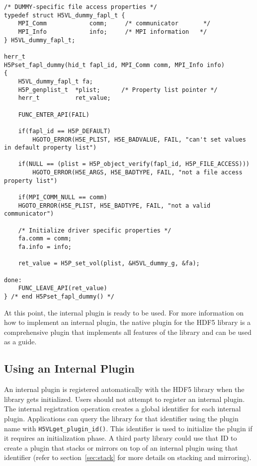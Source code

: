 \begin{lstlisting}
/* DUMMY-specific file access properties */
typedef struct H5VL_dummy_fapl_t {
    MPI_Comm            comm;     /* communicator       */
    MPI_Info            info;     /* MPI information   */
} H5VL_dummy_fapl_t;

herr_t
H5Pset_fapl_dummy(hid_t fapl_id, MPI_Comm comm, MPI_Info info)
{
    H5VL_dummy_fapl_t fa;
    H5P_genplist_t  *plist;      /* Property list pointer */
    herr_t          ret_value;

    FUNC_ENTER_API(FAIL)

    if(fapl_id == H5P_DEFAULT)
        HGOTO_ERROR(H5E_PLIST, H5E_BADVALUE, FAIL, "can't set values in default property list")

    if(NULL == (plist = H5P_object_verify(fapl_id, H5P_FILE_ACCESS)))
        HGOTO_ERROR(H5E_ARGS, H5E_BADTYPE, FAIL, "not a file access property list")

    if(MPI_COMM_NULL == comm)
	HGOTO_ERROR(H5E_PLIST, H5E_BADTYPE, FAIL, "not a valid communicator")

    /* Initialize driver specific properties */
    fa.comm = comm;
    fa.info = info;

    ret_value = H5P_set_vol(plist, &H5VL_dummy_g, &fa);

done:
    FUNC_LEAVE_API(ret_value)
} /* end H5Pset_fapl_dummy() */
\end{lstlisting}

At this point, the internal plugin is ready to be used. For more
information on how to implement an internal plugin, the native plugin
for the HDF5 library is a comprehensive plugin that implements all
features of the library and can be used as a guide.

\subsection{Using an Internal Plugin}
An internal plugin is registered automatically with the HDF5 library when the library gets initialized. Users should not attempt to register an internal plugin. The internal registration operation creates a global identifier for each internal plugin. Applications can query the library for that identifier using the plugin name with {\tt H5VLget\_plugin\_id()}. This identifier is used to initialize the plugin if it requires an initialization phase. A third party library could use that ID to create a plugin that stacks or mirrors on top of an internal plugin using that identifier (refer to section~\ref{sec:stack} for more details on stacking and mirroring).

